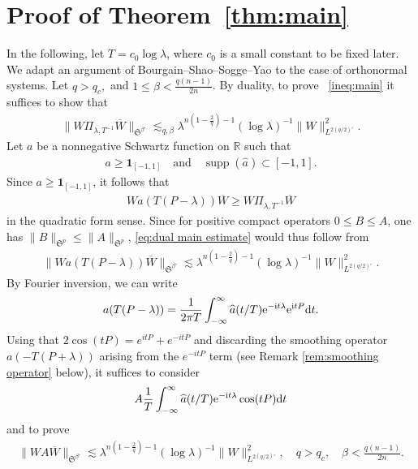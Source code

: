 \documentclass[12pt,reqno,a4paper]{amsart}
\let\coloneq\relax
\newcommand{\coloneq}{\coloneqq}
\newcommand{\rd}{{\rm d}}
\newcommand{\e}{{\rm e}}
\newcommand{\R}{{\mathbb R}}
\newcommand\I{\mathrm{i}}
\DeclareMathOperator{\supp}{supp}
\begin{document}
\section{Proof of Theorem~\ref{thm:main}}\label{sect. Bourgain--Shao--Sogge--Yao argument}
In the following,  let $T=c_0\log\lambda$, where $c_0$ is a small constant to be fixed later. 
  We adapt an argument of Bourgain--Shao--Sogge--Yao \cite{BourgainShaoYaoSogge-2015} to the case of orthonormal systems. Let $q>q_c,$ and $1\leq\beta<\frac{q(n-1)}{2n}$. By duality, to prove ~\eqref{ineq:main} it suffices to show that
  \begin{align}\label{eq:dual main estimate}
    \|W\Pi_{\lambda,T^{-1}}\overline{W}\|_{\mathfrak{S}^{\beta'}}\lesssim_{q,\beta} \lambda^{n(1-\frac{2}{q})-1}(\log\lambda)^{-1}\|W\|^2_{L^{2(q/2)'}}.
  \end{align}
  Let $a$ be a nonnegative Schwartz function on $\R$ such that
  \begin{align}
    a\geq \mathbf{1}_{[-1,1]} \quad\text{and}\quad \supp(\widehat{a})\subset[-1,1].
  \end{align}
  Since $a\geq \mathbf{1}_{[-1,1]}$, it follows that
  \begin{align}
    Wa(T(P-\lambda))\overline{W}\geq W\Pi_{\lambda,T^{-1}} \overline{W}
  \end{align}
  in the quadratic form sense.
  Since for positive compact operators \(0\le B\le A\), one has \(\|B\|_{\mathfrak S^p}\le \|A\|_{\mathfrak S^p}\), \eqref{eq:dual main estimate} would thus follow from
  \begin{align}\label{eq:dual main estimate smooth}
    \|Wa(T(P-\lambda))\overline{W}\|_{\mathfrak{S}^{\beta'}}\lesssim \lambda^{n(1-\frac{2}{q})-1}(\log\lambda)^{-1}\|W\|^2_{L^{2(q/2)'}}.
  \end{align}
  By Fourier inversion, we can write
  \begin{align}
    a(T(P-\lambda))=\frac{1}{2\pi T}\int_{-\infty}^{\infty}\widehat{a}(t/T)\e^{-\I t\lambda}\e^{\I tP}\rd t .
  \end{align}
  Using that $2\cos (tP) = e^{i t P} + e^{-i t P}$ and discarding the smoothing operator $a(-T(P+\lambda))$ arising from the $e^{-i t P}$ term (see Remark \ref{rem:smoothing operator} below), it suffices to consider
  \begin{align}
    A\coloneq\frac{1}{T}\int_{-\infty}^{\infty}\widehat{a}(t/T)\e^{-\I t\lambda}\cos(tP) \rd t
  \end{align}
  and to prove 
  \begin{align}\label{eq:dual main estimate smooth cos}
    \|WA\overline{W}\|_{\mathfrak{S}^{\beta'}}\lesssim \lambda^{n(1-\frac{2}{q})-1}(\log\lambda)^{-1}\|W\|^2_{L^{2(q/2)'}},\quad q>q_c,\quad \beta<\frac{q(n-1)}{2n} .
  \end{align}
  
\end{document}
